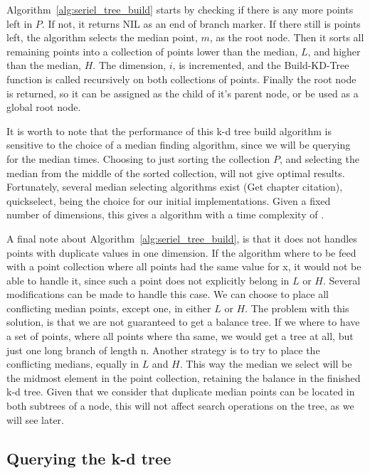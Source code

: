 Algorithm~\ref{alg:seriel_tree_build} starts by checking if there is any more points left in $P$. If not, it returns NIL as an end of branch marker. If there still is points left, the algorithm selects the median point, $m$, as the root node. Then it sorts all remaining points into a collection of points lower than the median, $L$, and higher than the median, $H$. The dimension, $i$, is incremented, and the Build-KD-Tree function is called recursively on both collections of points. Finally the root node is returned, so it can be assigned as the child of it's parent node, or be used as a global root node.

It is worth to note that the performance of this k-d tree build algorithm is sensitive to the choice of a median finding algorithm, since we will be querying for the median  times. Choosing to just sorting the collection $P$, and selecting the median from the middle of the sorted collection, will not give optimal results. Fortunately, several  median selecting algorithms exist\cite{Cormen:2001} (Get chapter citation), quickselect, being the choice for our initial implementations. Given a fixed number of dimensions, this gives a algorithm with a time complexity of \cite{Friedman:1977}.

A final note about Algorithm~\ref{alg:seriel_tree_build}, is that it does not handles points with duplicate values in one dimension. If the algorithm where to be feed with a point collection where all points had the same value for x, it would not be able to handle it, since such a point does not explicitly belong in $L$ or $H$. Several modifications can be made to handle this case. We can choose to place all conflicting median points, except one, in either $L$ or $H$. The problem with this solution, is that we are not guaranteed to get a balance tree. If we where to have a set of points, where all points where tha same, we would get a tree at all, but just one long branch of length n. Another strategy is to try to place the conflicting medians, equally in $L$ and $H$. This way the median we select will be the midmost element in the point collection, retaining the balance in the finished k-d tree. Given that we consider that duplicate median points can be located in both subtrees of a node, this will not affect search operations on the tree, as we will see later.

\subsection{Querying the k-d tree}  %
\label{sub:querying_the_k_d_tree} 

